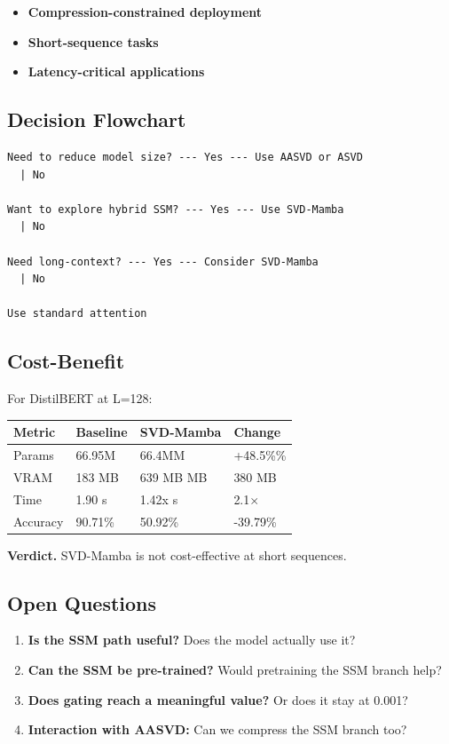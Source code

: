 \begin{itemize}
\item \textbf{Compression-constrained deployment}
\item \textbf{Short-sequence tasks}
\item \textbf{Latency-critical applications}

\end{itemize}
\subsection{Decision Flowchart}

\begin{lstlisting}
Need to reduce model size? --- Yes --- Use AASVD or ASVD
  | No
   
Want to explore hybrid SSM? --- Yes --- Use SVD-Mamba
  | No
   
Need long-context? --- Yes --- Consider SVD-Mamba
  | No
   
Use standard attention
\end{lstlisting}

\subsection{Cost-Benefit}

For DistilBERT at L=128:

\begin{table}[H]
\centering
\small
\begin{tabular}{llll}
\toprule
\textbf{Metric} & \textbf{Baseline} & \textbf{SVD-Mamba} & \textbf{Change} \\
\midrule
Params & 66.95M & 66.4MM & +48.5\%\% \\
VRAM & 183 MB & 639 MB MB & 380 MB \\
Time & 1.90 s & 1.42x s & 2.1$\times$ \\
Accuracy & 90.71\% & 50.92\% & -39.79\% \\
\bottomrule
\end{tabular}
\end{table}

\textbf{Verdict.} SVD-Mamba is not cost-effective at short sequences.

\subsection{Open Questions}

\begin{enumerate}
\item \textbf{Is the SSM path useful?} Does the model actually use it?
\item \textbf{Can the SSM be pre-trained?} Would pretraining the SSM branch
  help?
\item \textbf{Does gating reach a meaningful value?} Or does it stay at 0.001?
\item \textbf{Interaction with AASVD:} Can we compress the SSM branch too?

\end{enumerate}
